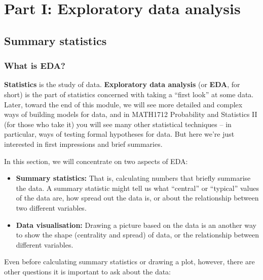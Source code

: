 \documentclass[
  a4paper,
]{book}
\providecommand{\tightlist}{%
  \setlength{\itemsep}{0pt}\setlength{\parskip}{0pt}}
\theoremstyle{definition}
\theoremstyle{definition}
\theoremstyle{definition}
\theoremstyle{definition}
\theoremstyle{remark}
\begin{document}
\hypertarget{part-part-i-exploratory-data-analysis}{%
\part*{Part I: Exploratory data analysis}\label{part-part-i-exploratory-data-analysis}}

\hypertarget{L01-stats}{%
\chapter{Summary statistics}\label{L01-stats}}

\hypertarget{what-is-eda}{%
\section{What is EDA?}\label{what-is-eda}}

\textbf{Statistics} is the study of data. \textbf{Exploratory data analysis} (or \textbf{EDA}, for short) is the part of statistics concerned with taking a ``first look'' at some data. Later, toward the end of this module, we will see more detailed and complex ways of building models for data, and in MATH1712 Probability and Statistics II (for those who take it) you will see many other statistical techniques -- in particular, ways of testing formal hypotheses for data. But here we're just interested in first impressions and brief summaries.

In this section, we will concentrate on two aspects of EDA:

\begin{itemize}
\tightlist
\item
  \textbf{Summary statistics:} That is, calculating numbers that briefly summarise the data. A summary statistic might tell us what ``central'' or ``typical'' values of the data are, how spread out the data is, or about the relationship between two different variables.
\item
  \textbf{Data visualisation:} Drawing a picture based on the data is an another way to show the shape (centrality and spread) of data, or the relationship between different variables.
\end{itemize}

Even before calculating summary statistics or drawing a plot, however, there are other questions it is important to ask about the data:
\end{document}
